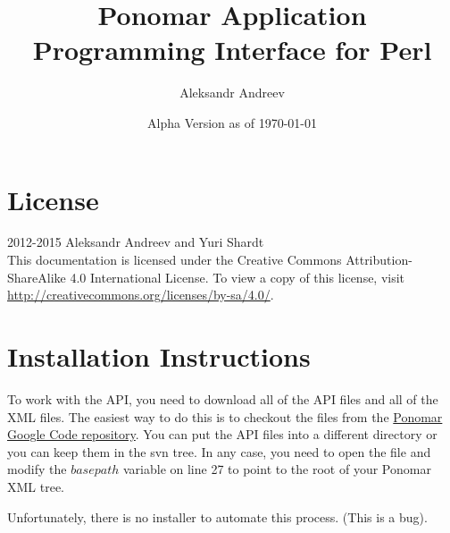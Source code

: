 \documentclass{article}
\title{Ponomar Application Programming Interface for Perl}
\author{Aleksandr Andreev}
\date{Alpha Version as of \today}
\begin{document}
\maketitle
\tableofcontents
\clearpage

\section{License}
\textcopyright{} 2012-2015 Aleksandr Andreev and Yuri Shardt \\

This documentation is licensed under the Creative Commons Attribution-ShareAlike 4.0 International License. To view a copy of this license, visit \href{http://creativecommons.org/licenses/by-sa/4.0/}{http://creativecommons.org/licenses/by-sa/4.0/}.

\section{Installation Instructions}

To work with the API, you need to download all of the API files and all of the XML files. The easiest way to do this is to checkout the files from the \href{https://code.google.com/p/ponomar}{Ponomar Google Code repository}.
You can put the API files into a different directory or you can keep them in the svn tree. In any case, you need to open the  file and
modify the $basepath$ variable on line 27 to point to the root of your Ponomar XML tree. 

Unfortunately, there is no installer to automate this process. (This is a bug).

\clearpage
\end{document}
